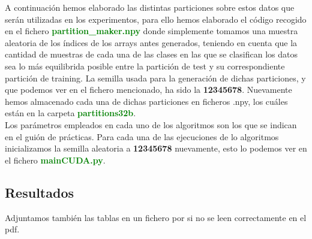 \documentclass[10pt,a4paper]{article}
\begin{document}
A continuación hemos elaborado las distintas particiones sobre estos datos que serán utilizadas en los experimentos, para ello hemos elaborado el código recogido en el fichero \textbf{\textcolor{green}{partition\_maker.npy}} donde simplemente tomamos una muestra aleatoria de los índices de los arrays antes generados, teniendo en cuenta que la cantidad de muestras de cada una de las clases en las que se clasifican los datos sea lo más equilibrida posible entre la partición de test y su correspondiente partición de training. La semilla usada para la generación de dichas particiones, y que podemos ver en el fichero mencionado, ha sido la \textbf{12345678}. Nuevamente hemos almacenado cada una de dichas particiones en ficheros .npy, los cuáles están en la carpeta \textbf{\textcolor{green}{partitions32b}}.\\

Los parámetros empleados en cada uno de los algoritmos son los que se indican en el guión de prácticas. Para cada una de las ejecuciones de lo algoritmos inicializamos la semilla aleatoria a \textbf{12345678} nuevamente, esto lo podemos ver en el fichero \textbf{\textcolor{green}{mainCUDA.py}}.\\


\subsection{\color[rgb]{0.0,0.0,0.51}Resultados}

Adjuntamos también las tablas en un fichero por si no se leen correctamente en el pdf.
\end{document}
